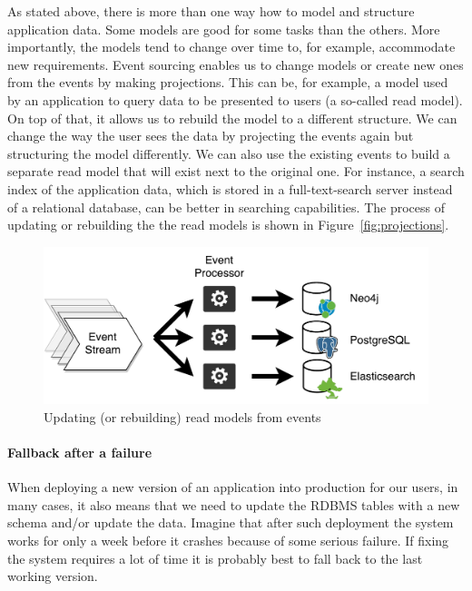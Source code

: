 \documentclass{book}
\begin{document}
As stated above, there is more than one way how to model and structure
application data. Some models are good for some tasks than the others.
More importantly, the models tend to change over time to, for example,
accommodate new requirements. Event sourcing enables us to change models
or create new ones from the events by making projections. This can be,
for example, a model used by an application to query data to be
presented to users (a so-called read model). On top of that, it allows
us to rebuild the model to a different structure. We can change the way
the user sees the data by projecting the events again but structuring
the model differently. We can also use the existing events to build a
separate read model that will exist next to the original one. For
instance, a search index of the application data, which is stored in a
full-text-search server instead of a relational database, can be better
in searching capabilities. The process of updating or rebuilding the the
read models is shown in Figure~\ref{fig:projections}.~\cite{greg-youtube}


\begin{figure}[h!]
\begin{center}
\includegraphics[width=0.84\columnwidth]{figures/projections/projections}
\caption{Updating (or rebuilding) read models from events%
}
\end{center}
\end{figure}

\paragraph{Fallback after a failure}\label{fallback-after-a-failure}

When deploying a new version of an application into production for our
users, in many cases, it also means that we need to update the RDBMS
tables with a new schema and/or update the data. Imagine that after such
deployment the system works for only a week before it crashes because of
some serious failure. If fixing the system requires a lot of time it is
probably best to fall back to the last working version.
\end{document}
